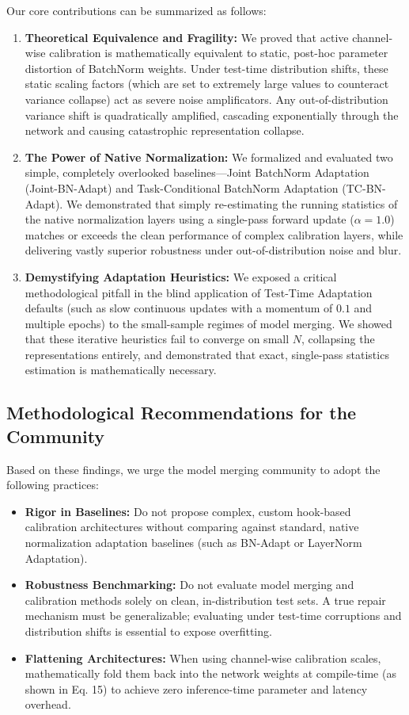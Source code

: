 \documentclass{article}
\begin{document}
Our core contributions can be summarized as follows:
\begin{enumerate}
    \item \textbf{Theoretical Equivalence and Fragility:} We proved that active channel-wise calibration is mathematically equivalent to static, post-hoc parameter distortion of BatchNorm weights. Under test-time distribution shifts, these static scaling factors (which are set to extremely large values to counteract variance collapse) act as severe noise amplificators. Any out-of-distribution variance shift is quadratically amplified, cascading exponentially through the network and causing catastrophic representation collapse.
    \item \textbf{The Power of Native Normalization:} We formalized and evaluated two simple, completely overlooked baselines—Joint BatchNorm Adaptation (Joint-BN-Adapt) and Task-Conditional BatchNorm Adaptation (TC-BN-Adapt). We demonstrated that simply re-estimating the running statistics of the native normalization layers using a single-pass forward update ($\alpha = 1.0$) matches or exceeds the clean performance of complex calibration layers, while delivering vastly superior robustness under out-of-distribution noise and blur.
    \item \textbf{Demystifying Adaptation Heuristics:} We exposed a critical methodological pitfall in the blind application of Test-Time Adaptation defaults (such as slow continuous updates with a momentum of $0.1$ and multiple epochs) to the small-sample regimes of model merging. We showed that these iterative heuristics fail to converge on small $N$, collapsing the representations entirely, and demonstrated that exact, single-pass statistics estimation is mathematically necessary.
\end{enumerate}

\subsection{Methodological Recommendations for the Community}
Based on these findings, we urge the model merging community to adopt the following practices:
\begin{itemize}
    \item \textbf{Rigor in Baselines:} Do not propose complex, custom hook-based calibration architectures without comparing against standard, native normalization adaptation baselines (such as BN-Adapt or LayerNorm Adaptation).
    \item \textbf{Robustness Benchmarking:} Do not evaluate model merging and calibration methods solely on clean, in-distribution test sets. A true repair mechanism must be generalizable; evaluating under test-time corruptions and distribution shifts is essential to expose overfitting.
    \item \textbf{Flattening Architectures:} When using channel-wise calibration scales, mathematically fold them back into the network weights at compile-time (as shown in Eq. 15) to achieve zero inference-time parameter and latency overhead.
\end{itemize}
\end{document}
